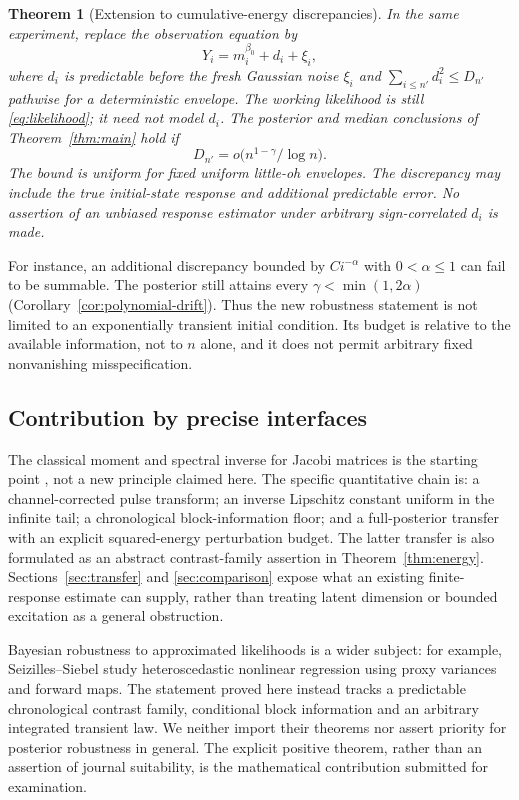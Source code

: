 \documentclass[11pt,reqno]{amsart}
\newtheorem{theorem}{Theorem}[section]
\theoremstyle{remark}\newtheorem{remark}[theorem]{Remark}
\begin{document}
\begin{theorem}[Extension to cumulative-energy discrepancies]
\label{thm:main-drift}
In the same experiment, replace the observation equation by
\[
 Y_i=m_i^{\beta_0}+d_i+\xi_i,
\]
where $d_i$ is predictable before the fresh Gaussian noise $\xi_i$ and
$\sum_{i\le n'}d_i^2\le D_{n'}$ pathwise for a deterministic envelope.
The working likelihood is still \eqref{eq:likelihood}; it need not model $d_i$.
The posterior and median conclusions of Theorem~\ref{thm:main} hold if
\begin{equation}
 D_{n'}=o\bigl(n^{1-\gamma}/\log n\bigr).
 \label{eq:main-drift-rate}
\end{equation}
The bound is uniform for fixed uniform little-oh envelopes. The discrepancy
may include the true initial-state response and additional predictable error.
No assertion of an unbiased response estimator under arbitrary sign-correlated
$d_i$ is made.
\end{theorem}

For instance, an additional discrepancy bounded by $C i^{-\alpha}$ with
$0<\alpha\le1$ can fail to be summable. The posterior still attains every
$\gamma<\min(1,2\alpha)$ (Corollary~\ref{cor:polynomial-drift}). Thus the
new robustness statement is not limited to an exponentially transient initial
condition. Its budget is relative to the available information, not to $n$
alone, and it does not permit arbitrary fixed nonvanishing misspecification.

\subsection{Contribution by precise interfaces}
The classical moment and spectral inverse for Jacobi matrices is the
starting point \cite{Teschl,MM2019}, not a new principle claimed here.
The specific quantitative chain is: a channel-corrected pulse transform;
an inverse Lipschitz constant uniform in the infinite tail; a chronological
block-information floor; and a full-posterior transfer with an explicit
squared-energy perturbation budget. The latter transfer is also formulated
as an abstract contrast-family assertion in Theorem~\ref{thm:energy}.
Sections~\ref{sec:transfer} and \ref{sec:comparison} expose what an existing
finite-response estimate can supply, rather than treating latent dimension
or bounded excitation as a general obstruction.

Bayesian robustness to approximated likelihoods is a wider subject: for
example, Seizilles--Siebel \cite{SS2026} study heteroscedastic nonlinear
regression using proxy variances and forward maps. The statement proved here
instead tracks a predictable chronological contrast family, conditional block
information and an arbitrary integrated transient law. We neither import
their theorems nor assert priority for posterior robustness in general.
The explicit positive theorem, rather than an assertion of journal suitability,
is the mathematical contribution submitted for examination.
\end{document}
